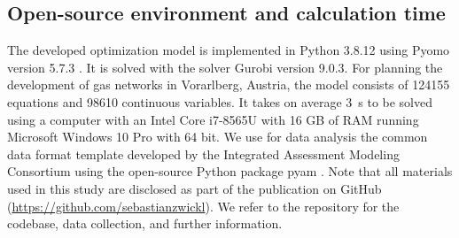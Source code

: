 \subsection{Open-source environment and calculation time}\label{environment}
The developed optimization model is implemented in Python 3.8.12 using  Pyomo version 5.7.3 \cite{hart2017optimization}. It is solved with the solver Gurobi version 9.0.3. For planning the development of gas networks in Vorarlberg, Austria, the model consists of 124155 equations and 98610 continuous variables. It takes on average \SI{3}{\second} to be solved using a computer with an Intel Core i7-8565U with 16 GB of RAM running Microsoft Windows 10 Pro with 64 bit. We use for data analysis the common data format template developed by the Integrated Assessment Modeling Consortium using the open-source Python package pyam \cite{huppmann2021pyam}. Note that all materials used in this study are disclosed as part of the publication on GitHub (\url{https://github.com/sebastianzwickl}). We refer to the repository for the codebase, data collection, and further information.